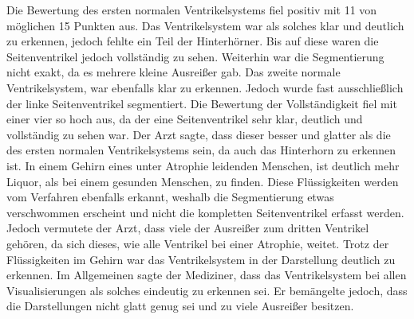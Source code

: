 Die Bewertung des ersten normalen Ventrikelsystems fiel positiv mit 11 von möglichen 15 Punkten aus. Das Ventrikelsystem war als solches klar und deutlich zu erkennen, jedoch fehlte ein Teil der Hinterhörner. Bis auf diese waren die Seitenventrikel jedoch vollständig zu sehen. Weiterhin war die Segmentierung nicht exakt, da es mehrere kleine Ausreißer gab.
\newline
Das zweite normale Ventrikelsystem, war ebenfalls klar zu erkennen. Jedoch wurde fast ausschließlich der linke Seitenventrikel segmentiert. Die Bewertung der Vollständigkeit fiel mit einer vier so hoch aus, da der eine Seitenventrikel sehr klar, deutlich und vollständig zu sehen war. Der Arzt sagte, dass dieser besser und glatter als die des ersten normalen Ventrikelsystems sein, da auch das Hinterhorn zu erkennen ist. 
\newline
In einem Gehirn eines unter Atrophie leidenden Menschen, ist deutlich mehr Liquor, als bei einem gesunden Menschen, zu finden. Diese Flüssigkeiten werden vom Verfahren ebenfalls erkannt, weshalb die Segmentierung etwas verschwommen erscheint und nicht die kompletten Seitenventrikel erfasst werden. Jedoch vermutete der Arzt, dass viele der Ausreißer zum dritten Ventrikel gehören, da sich dieses, wie alle Ventrikel bei einer Atrophie, weitet. Trotz der Flüssigkeiten im Gehirn war das Ventrikelsystem in der Darstellung deutlich zu erkennen.
\newline
 Im Allgemeinen sagte der Mediziner, dass das Ventrikelsystem bei allen Visualisierungen als solches eindeutig zu erkennen sei. Er bemängelte jedoch, dass die Darstellungen nicht glatt genug sei und zu viele Ausreißer besitzen.




